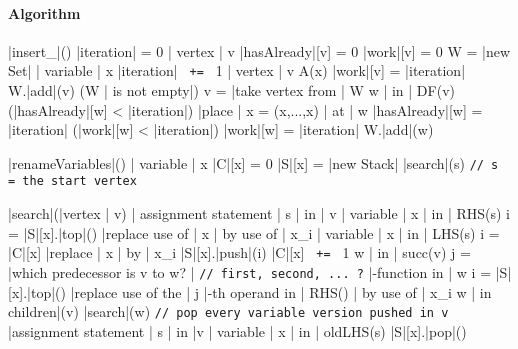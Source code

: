 \documentclass[a4paper,12pt, notitlepage]{article}
\newcommand{\negv}{\vspace{-0.7cm}}
\begin{document}
\paragraph*{Algorithm}
\begin{program}
\PROC |insert_|\Phi() \BODY
    |iteration| = 0
    \FOREACH | vertex | v \DO
        |hasAlready|[v] = 0
        |work|[v] = 0
    \OD
    W = |new Set|
    \FOREACH | variable | x \DO
        |iteration| \texttt{ += } 1
        \FOREACH | vertex | v \in A(x) \DO
            |work|[v] = |iteration|
            W.|add|(v)
        \OD
        \WHILE (W | is not empty|) \DO 
            v = |take vertex from | W
            \FOREACH w | in | DF(v) \DO
                \IF (|hasAlready|[w] < |iteration|) \AR*
                    |place | x = \Phi(x,...,x) | at | w
                    |hasAlready|[w] = |iteration|
                    \IF (|work|[w] < |iteration|) \AR*
                        |work|[w] = |iteration|
                        W.|add|(w)
                    \FI
                \FI
            \OD
        \OD
    \OD
\end{program}
\negv
\begin{program}
\PROC |renameVariables|() \BODY
    \FOREACH | variable | x \DO
        |C|[x] = 0
        |S|[x] = |new Stack|
    \OD
    |search|(s) \hspace{1cm} \texttt{// s = the start vertex}
\end{program}
\pagebreak
\begin{program}
\PROC |search|(|vertex | v) \BODY
    \FOREACH | assignment statement | s | in | v \DO
        \FOREACH | variable | x | in | RHS(s) \DO
            i = |S|[x].|top|()
            |replace use of | x | by use of | x_i
        \OD
        \FOREACH | variable | x | in | LHS(s) \DO
            i = |C|[x]
            |replace | x | by | x_i
            |S|[x].|push|(i)
            |C|[x] \texttt{ += } 1
        \OD
    \OD
    \FOREACH w | in | succ(v) \DO
        j = |which predecessor is v to w? | \hspace{1cm} \texttt{// first, second, ... ?}
        \FOREACH \Phi|-function in | w \DO
            i = |S|[x].|top|()
            |replace use of the | j |-th operand in | RHS(\Phi) | by use of | x_i
        \OD
    \OD
    \FOREACH w | in children|(v) \DO
        |search|(w)
    \texttt{// pop every variable version pushed in v}
    \FOREACH |assignment statement | s | in |v \DO
        \FOREACH | variable | x | in | oldLHS(s) \DO
            |S|[x].|pop|()
        \OD
    \OD
\end{program}
\end{document}
